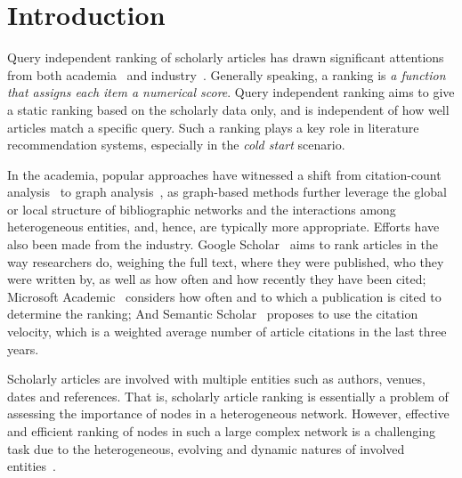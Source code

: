 \section{Introduction}
\label{sec-intro}

Query independent ranking of scholarly articles has drawn significant attentions from both academia~\cite{Garfield471,Hirsch15112005,Liang16AAAI,Jiang12-MRank,Waltman2014,Wang16TIST,Ng11KDD,Li08TSRanking,
Wang13AAAI,sayyadi09,WalkerXKM07,TanLMGSW16} and industry~\cite{g-scholar,Sinha15:MAG,sem-scholar}.
Generally speaking, a ranking is {\em a function that assigns each item a numerical score}. Query independent ranking aims to give a static ranking based on the scholarly  data only, and is independent of how well articles match a specific query. Such a ranking plays a key role in literature recommendation systems, especially in the {\em cold start} scenario.

In the academia, popular approaches have witnessed a shift from citation-count analysis~\cite{Garfield471,Hirsch15112005} to graph analysis~\cite{Liang16AAAI,Jiang12-MRank,Waltman2014,Wang16TIST,Ng11KDD,Li08TSRanking,Wang13AAAI,sayyadi09,WalkerXKM07}, as graph-based methods further leverage the global or local structure of bibliographic networks and  the interactions among heterogeneous entities, and, hence, are typically more appropriate.
%
Efforts have also been made from the industry. Google Scholar~\cite{g-scholar} aims to rank articles in the way researchers do, weighing the full text, where they were published, who they were written by, as well as how often and how recently they have been cited; Microsoft Academic~\cite{Sinha15:MAG} considers how often and to which a publication is cited to determine the ranking; And
Semantic Scholar~\cite{sem-scholar} proposes to use the citation velocity, which is a weighted average number of article citations in the last three years.




Scholarly articles are involved with multiple entities such as authors, venues, dates and references. That is, scholarly article ranking is essentially a problem of assessing the importance of nodes in a heterogeneous network.
However, effective and efficient ranking of nodes in such a large complex network is a challenging task due to the heterogeneous, evolving and dynamic natures of involved entities~\cite{AggarwalS14-survey,fcs-biggraph}.

